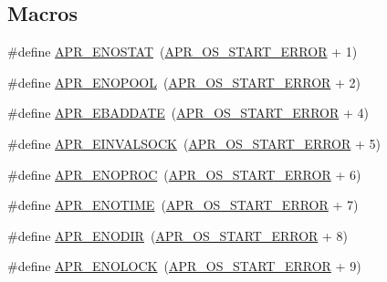 \subsection*{Macros}
\begin{DoxyCompactItemize}
\item 
\#define \hyperlink{group__APR__Error_ga7995805cf68be1fb16f684c544e45fbe}{A\+P\+R\+\_\+\+E\+N\+O\+S\+T\+AT}~(\hyperlink{group__apr__errno_ga191894048b7bd0cca3cf0bdff1eb695b}{A\+P\+R\+\_\+\+O\+S\+\_\+\+S\+T\+A\+R\+T\+\_\+\+E\+R\+R\+OR} + 1)
\item 
\#define \hyperlink{group__APR__Error_gaa8461873202e5e0b4c0ea261e05b07a9}{A\+P\+R\+\_\+\+E\+N\+O\+P\+O\+OL}~(\hyperlink{group__apr__errno_ga191894048b7bd0cca3cf0bdff1eb695b}{A\+P\+R\+\_\+\+O\+S\+\_\+\+S\+T\+A\+R\+T\+\_\+\+E\+R\+R\+OR} + 2)
\item 
\#define \hyperlink{group__APR__Error_ga7911720c540a929cc08a2c25e606b56e}{A\+P\+R\+\_\+\+E\+B\+A\+D\+D\+A\+TE}~(\hyperlink{group__apr__errno_ga191894048b7bd0cca3cf0bdff1eb695b}{A\+P\+R\+\_\+\+O\+S\+\_\+\+S\+T\+A\+R\+T\+\_\+\+E\+R\+R\+OR} + 4)
\item 
\#define \hyperlink{group__APR__Error_ga548032b79ce0671d9986db0654858812}{A\+P\+R\+\_\+\+E\+I\+N\+V\+A\+L\+S\+O\+CK}~(\hyperlink{group__apr__errno_ga191894048b7bd0cca3cf0bdff1eb695b}{A\+P\+R\+\_\+\+O\+S\+\_\+\+S\+T\+A\+R\+T\+\_\+\+E\+R\+R\+OR} + 5)
\item 
\#define \hyperlink{group__APR__Error_ga18aa6d4ebaefda39478649c20bbeb9df}{A\+P\+R\+\_\+\+E\+N\+O\+P\+R\+OC}~(\hyperlink{group__apr__errno_ga191894048b7bd0cca3cf0bdff1eb695b}{A\+P\+R\+\_\+\+O\+S\+\_\+\+S\+T\+A\+R\+T\+\_\+\+E\+R\+R\+OR} + 6)
\item 
\#define \hyperlink{group__APR__Error_ga7acfb436774a21ae93ff5c1b89e7c4f5}{A\+P\+R\+\_\+\+E\+N\+O\+T\+I\+ME}~(\hyperlink{group__apr__errno_ga191894048b7bd0cca3cf0bdff1eb695b}{A\+P\+R\+\_\+\+O\+S\+\_\+\+S\+T\+A\+R\+T\+\_\+\+E\+R\+R\+OR} + 7)
\item 
\#define \hyperlink{group__APR__Error_ga9a8077e85b6241c1e91b69548395fc09}{A\+P\+R\+\_\+\+E\+N\+O\+D\+IR}~(\hyperlink{group__apr__errno_ga191894048b7bd0cca3cf0bdff1eb695b}{A\+P\+R\+\_\+\+O\+S\+\_\+\+S\+T\+A\+R\+T\+\_\+\+E\+R\+R\+OR} + 8)
\item 
\#define \hyperlink{group__APR__Error_ga9c411624c42f7562a5c6c3461bdcb0ec}{A\+P\+R\+\_\+\+E\+N\+O\+L\+O\+CK}~(\hyperlink{group__apr__errno_ga191894048b7bd0cca3cf0bdff1eb695b}{A\+P\+R\+\_\+\+O\+S\+\_\+\+S\+T\+A\+R\+T\+\_\+\+E\+R\+R\+OR} + 9)
\item 

\end{DoxyCompactItemize}
